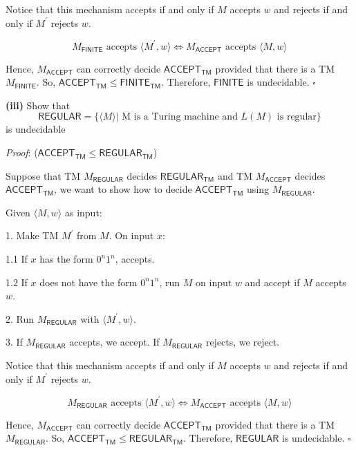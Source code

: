 \documentclass[a4paper, 11pt]{article}
\renewcommand{\part}[1] {\vspace{.10in} {\bf (#1)}}
\begin{document}
	Notice that this mechanism accepts if and only if $M$ accepts $w$ and rejects if and only if $M^\prime$ rejects $w$. 
	
	$$ M_{\textsf{FINITE}} \text{ accepts }\langle M^\prime,w \rangle \iff M_{\textsf{ACCEPT}} \text{ accepts } \langle M,w\rangle $$
	
	Hence, $M_{\textsf{ACCEPT}}$ can correctly decide $\textsf{ACCEPT}_{\textsf{TM}}$ provided that there is a TM $M_{\textsf{FINITE}}$. So, $\textsf{ACCEPT}_{\textsf{TM}} \leq \textsf{FINITE}_{\textsf{TM}} $. Therefore, $\textsf{FINITE}$ is undecidable. $\square$

	\part{iii} Show that 
	$$ \textsf{REGULAR} = \{\langle M \rangle | \text{ M is a Turing machine and $L(M)$ is regular} \} $$ is undecidable


	{\em Proof}: ($\textsf{ACCEPT}_{\textsf{TM}} \leq \textsf{REGULAR}_{\textsf{TM}} $)

	Suppose that TM $M_{\textsf{REGULAR}}$ decides $\textsf{REGULAR}_{\textsf{TM}}$ and TM $M_{\textsf{ACCEPT}}$ decides $\textsf{ACCEPT}_{\textsf{TM}}$, we want to show how to decide $\textsf{ACCEPT}_{\textsf{TM}}$ using $M_{\textsf{REGULAR}}$.
	
	Given $\langle M, w \rangle$ as input:
	
	1. Make TM $M^\prime$ from $M$. On input $x$:
	
	1.1 If $x$ has the form $0^n1^n$, accepts.
	
	1.2 If $x$ does not have the form $0^n1^n$, run $M$ on input $w$ and accept if $M$ accepts $w$.
	
	2. Run $M_{\textsf{REGULAR}}$ with $\langle M^\prime, w \rangle$.
	
	3. If $M_{\textsf{REGULAR}}$ accepts, we accept. If $M_{\textsf{REGULAR}}$ rejects, we reject.
	
	Notice that this mechanism accepts if and only if $M$ accepts $w$ and rejects if and only if $M^\prime$ rejects $w$. 
	
	$$ M_{\textsf{REGULAR}} \text{ accepts }\langle M^\prime,w \rangle \iff M_{\textsf{ACCEPT}} \text{ accepts } \langle M,w\rangle $$
	
	Hence, $M_{\textsf{ACCEPT}}$ can correctly decide $\textsf{ACCEPT}_{\textsf{TM}}$ provided that there is a TM $M_{\textsf{REGULAR}}$. So, $\textsf{ACCEPT}_{\textsf{TM}} \leq \textsf{REGULAR}_{\textsf{TM}} $. Therefore, $\textsf{REGULAR}$ is undecidable. $\square$
	
\end{document}
